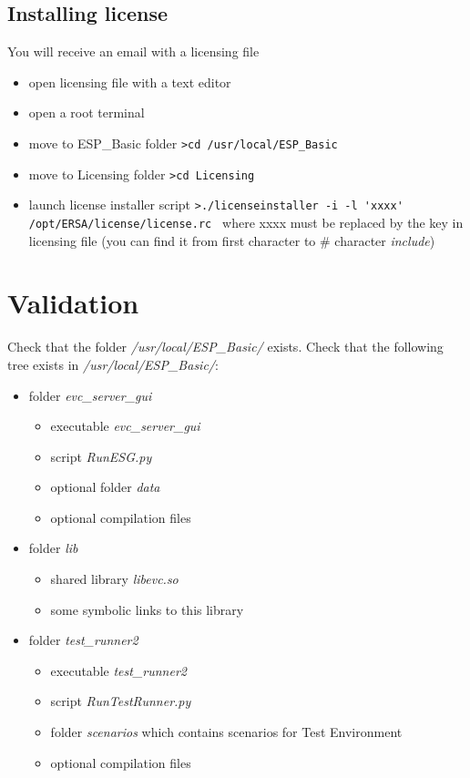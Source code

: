 \subsection{Installing license}

You will receive an email with a licensing file

\begin{itemize}
	\item open licensing file with a text editor
	\item open a root terminal
	\item move to ESP\_Basic folder
	\newline
	\verb|>cd /usr/local/ESP_Basic |          
	\item move to Licensing folder
	\newline	
	\verb|>cd Licensing |	
	\item launch license installer script	
	\newline	
	\verb|>./licenseinstaller -i -l 'xxxx' /opt/ERSA/license/license.rc |         where xxxx must be replaced by the key in licensing file (you can find it from first character to \# character \emph{include})	
\end{itemize}

\section{Validation}

Check that the folder \emph{/usr/local/ESP\_Basic/} exists.
\newline
Check that the following tree exists in \emph{/usr/local/ESP\_Basic/}:
\begin{itemize}
\item folder \emph{evc\_server\_gui}
\begin{itemize}
\item executable \emph{evc\_server\_gui}
\item script \emph{RunESG.py}
\item optional folder \emph{data}
\item optional compilation files
\end{itemize}
\item folder \emph{lib}
\begin{itemize}
\item shared library \emph{libevc.so}
\item some symbolic links to this library
\end{itemize}
\item folder \emph{test\_runner2}
\begin{itemize}
\item executable \emph{test\_runner2}
\item script \emph{RunTestRunner.py}
\item folder \emph{scenarios} which contains scenarios for Test Environment
\item optional compilation files
\end{itemize}
\end{itemize}

